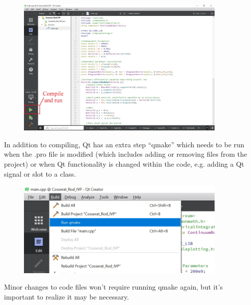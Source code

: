 \documentclass[12pt]{article}
\begin{document}
\begin{figure}[h]
	\centering
		\includegraphics[width=0.9\textwidth]{fig/compile_and_run.jpg}
\end{figure}
\clearpage

In addition to compiling, Qt has an extra step ``qmake'' which needs to be run when the .pro file is modified (which includes adding or removing files from the project) or when Qt functionality is changed within the code, e.g. adding a Qt signal or slot to a class.

\begin{figure}[h]
	\centering
		\includegraphics[width=0.9\textwidth]{fig/qmake.jpg}
\end{figure}

Minor changes to code files won't require running qmake again, but it's important to realize it may be necessary.
\end{document}
